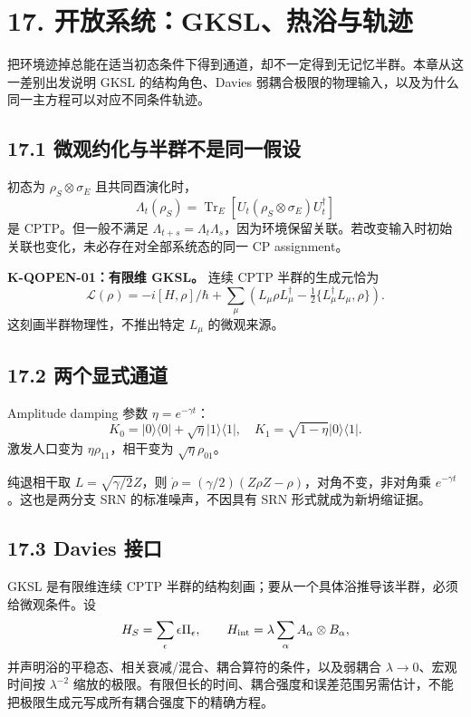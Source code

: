 \documentclass[
  11pt,
  oneside]{book}
\begin{document}
\chapter{17. 开放系统：GKSL、热浴与轨迹}\label{ch-17}\hypertarget{ch-17}{}

把环境迹掉总能在适当初态条件下得到通道，却不一定得到无记忆半群。本章从这一差别出发说明
GKSL 的结构角色、Davies
弱耦合极限的物理输入，以及为什么同一主方程可以对应不同条件轨迹。

\section{17.1 微观约化与半群不是同一假设}

初态为 \(\rho_S\otimes\sigma_E\) 且共同酉演化时， \[
\Lambda_t(\rho_S)=\operatorname{Tr}_E[
U_t(\rho_S\otimes\sigma_E)U_t^\dagger]
\] 是 CPTP。但一般不满足
\(\Lambda_{t+s}=\Lambda_t\Lambda_s\)，因为环境保留关联。若改变输入时初始关联也变化，未必存在对全部系统态的同一
CP assignment。

\textbf{K-QOPEN-01：有限维 GKSL。} 连续 CPTP 半群的生成元恰为 \[
\mathcal L(\rho)=-i[H,\rho]/\hbar+
\sum_\mu\left(L_\mu\rho L_\mu^\dagger-
\tfrac12\{L_\mu^\dagger L_\mu,\rho\}\right).
\] 这刻画半群物理性，不推出特定 \(L_\mu\) 的微观来源。

\section{17.2 两个显式通道}

Amplitude damping 参数 \(\eta=e^{-\gamma t}\)： \[
K_0=|0\rangle\langle0|+\sqrt\eta|1\rangle\langle1|,
\quad K_1=\sqrt{1-\eta}|0\rangle\langle1|.
\] 激发人口变为 \(\eta\rho_{11}\)，相干变为 \(\sqrt\eta\rho_{01}\)。

纯退相干取 \(L=\sqrt{\gamma/2}Z\)，则
\(\dot\rho=(\gamma/2)(Z\rho Z-\rho)\)，对角不变，非对角乘
\(e^{-\gamma t}\)。这也是两分支 SRN 的标准噪声，不因具有 SRN
形式就成为新坍缩证据。

\section{17.3 Davies 接口}

GKSL 是有限维连续 CPTP
半群的结构刻画；要从一个具体浴推导该半群，必须给微观条件。设 \[
H_S=\sum_\epsilon\epsilon\Pi_\epsilon,\qquad
H_{
\rm int}=\lambda\sum_\alpha A_\alpha\otimes B_\alpha,
\] 并声明浴的平稳态、相关衰减/混合、耦合算符的条件，以及弱耦合
\(\lambda\to0\)、宏观时间按 \(\lambda^{-2}\)
缩放的极限。有限但长的时间、耦合强度和误差范围另需估计，不能把极限生成元写成所有耦合强度下的精确方程。
\end{document}
